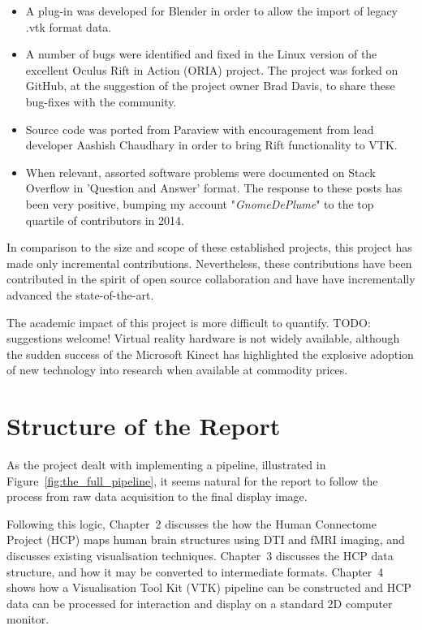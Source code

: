 \documentclass[MSc,paper=a4,pagesize=auto]{icldt}
\begin{document}
\begin{itemize}
  \item A plug-in was developed for Blender in order to allow the import of legacy .vtk format data.
  \item A number of bugs were identified and fixed in the Linux version of the excellent Oculus Rift in Action (ORIA) project. The project was forked on GitHub, at the suggestion of the project owner Brad Davis, to share these bug-fixes with the community.
  \item Source code was ported from Paraview with encouragement from lead developer Aashish Chaudhary in order to bring Rift functionality to VTK.
  \item When relevant, assorted software problems were documented on Stack Overflow in 'Question and Answer' format. The response to these posts has been very positive, bumping my account "\textit{GnomeDePlume}" to the top quartile of contributors in 2014.  
\end{itemize}

In comparison to the size and scope of these established projects, this project has made only incremental contributions. Nevertheless, these contributions have been contributed in the spirit of open source collaboration and have have incrementally advanced the state-of-the-art.

The academic impact of this project is more difficult to quantify. TODO: suggestions welcome! Virtual reality hardware is not widely available, although the sudden success of the Microsoft Kinect has highlighted the explosive adoption of new technology into research when available at commodity prices.

\newpage
\section{Structure of the Report}
As the project dealt with implementing a pipeline, illustrated in Figure~\ref{fig:the_full_pipeline}, it seems natural for the report to follow the process from raw data acquisition to the final display image. 

Following this logic, Chapter~2 discusses the how the Human Connectome Project (HCP) maps human brain structures using DTI and fMRI imaging, and discusses existing visualisation techniques. Chapter~3 discusses the HCP data structure, and how it may be converted to intermediate formats. Chapter~4 shows how a Visualisation Tool Kit (VTK) pipeline can be constructed and HCP data can be processed for interaction and display on a standard 2D computer monitor. 
\end{document}
